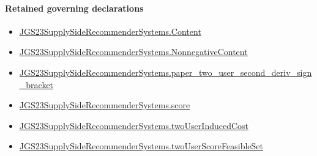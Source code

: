 \documentclass[10pt]{article}
\begin{document}
\paragraph{Retained governing declarations}
\begin{itemize}\raggedright
\item \hyperlink{governing-declaration-367305fda50f0ada}{JGS23\allowbreak{}Supply\allowbreak{}Side\allowbreak{}Recommender\allowbreak{}Systems.\allowbreak{}Content}
\item \hyperlink{governing-declaration-d426babe40b9593c}{JGS23\allowbreak{}Supply\allowbreak{}Side\allowbreak{}Recommender\allowbreak{}Systems.\allowbreak{}Nonnegative\allowbreak{}Content}
\item \hyperlink{governing-declaration-05e1b2c554446bd9}{JGS23\allowbreak{}Supply\allowbreak{}Side\allowbreak{}Recommender\allowbreak{}Systems.\allowbreak{}paper\_\allowbreak{}two\_\allowbreak{}user\_\allowbreak{}second\_\allowbreak{}deriv\_\allowbreak{}sign\_\allowbreak{}bracket}
\item \hyperlink{governing-declaration-e3725af4eb21c4db}{JGS23\allowbreak{}Supply\allowbreak{}Side\allowbreak{}Recommender\allowbreak{}Systems.\allowbreak{}score}
\item \hyperlink{governing-declaration-1ad07d9bd018250d}{JGS23\allowbreak{}Supply\allowbreak{}Side\allowbreak{}Recommender\allowbreak{}Systems.\allowbreak{}two\allowbreak{}User\allowbreak{}Induced\allowbreak{}Cost}
\item \hyperlink{governing-declaration-bca7e2616269bec3}{JGS23\allowbreak{}Supply\allowbreak{}Side\allowbreak{}Recommender\allowbreak{}Systems.\allowbreak{}two\allowbreak{}User\allowbreak{}Score\allowbreak{}Feasible\allowbreak{}Set}
\end{itemize}
\end{document}
